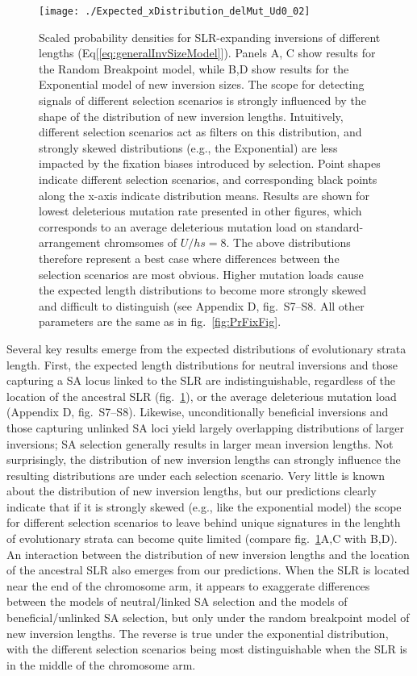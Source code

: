\documentclass{article}[12pt]
\begin{document}
 \begin{figure}[H]
 \centering
 \texttt{[image: ./Expected\_xDistribution\_delMut\_Ud0\_02]}
 \caption{Scaled probability densities for SLR-expanding inversions of different lengths (Eq[\ref{eq:generalInvSizeModel}]). Panels A, C show results for the Random Breakpoint model, while B,D show results for the Exponential model of new inversion sizes. The scope for detecting signals of different selection scenarios is strongly influenced by the shape of the distribution of new inversion lengths. Intuitively, different selection scenarios act as filters on this distribution, and strongly skewed distributions (e.g., the Exponential) are less impacted by the fixation biases introduced by selection. Point shapes indicate different selection scenarios, and corresponding black points along the x-axis indicate distribution means. Results are shown for lowest deleterious mutation rate presented in other figures, which corresponds to an average deleterious mutation load on standard-arrangement chromsomes of $U/hs = 8$. The above distributions therefore represent a best case where differences between the selection scenarios are most obvious. Higher mutation loads cause the expected length distributions to become more strongly skewed and difficult to distinguish (see Appendix D, fig.~S7--S8. All other parameters are the same as in fig.~\ref{fig:PrFixFig}.}
 \label{fig:ExpectedDistFig}
 \end{figure}

Several key results emerge from the expected distributions of evolutionary strata length. First, the expected length distributions for neutral inversions and those capturing a SA locus linked to the SLR are indistinguishable, regardless of the location of the ancestral SLR (fig.~\ref{fig:ExpectedDistFig}), or the average deleterious mutation load (Appendix D, fig.~S7--S8). Likewise, unconditionally beneficial inversions and those capturing unlinked SA loci yield largely overlapping distributions of larger inversions; SA selection generally results in larger mean inversion lengths. Not surprisingly, the distribution of new inversion lengths can strongly influence the resulting distributions are under each selection scenario. Very little is known about the distribution of new inversion lengths, but our predictions clearly indicate that if it is strongly skewed (e.g., like the exponential model) the scope for different selection scenarios to leave behind unique signatures in the lenghth of evolutionary strata can become quite limited (compare fig.~\ref{fig:ExpectedDistFig}A,C with B,D). An interaction between the distribution of new inversion lengths and the location of the ancestral SLR also emerges from our predictions. When the SLR is located near the end of the chromosome arm, it appears to exaggerate differences between the models of neutral/linked SA selection and the models of beneficial/unlinked SA selection, but only under the random breakpoint model of new inversion lengths. The reverse is true under the exponential distribution, with the different selection scenarios being most distinguishable when the SLR is in the middle of the chromosome arm. 
\end{document}
